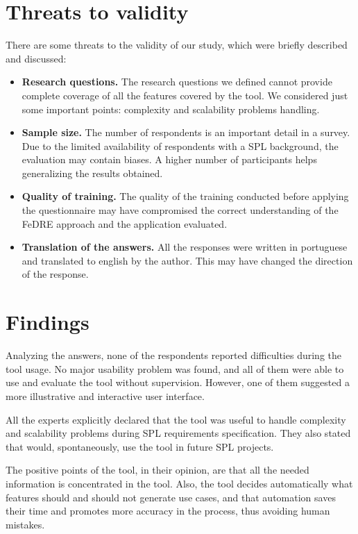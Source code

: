 \section{Threats to validity}
\label{sc:threats}
There are some threats to the validity of our study, which were briefly
described and discussed:
\begin{itemize}
\item \textbf{Research questions.} The research questions we defined cannot
provide complete coverage of all the features covered by the tool. We considered just some important points: complexity and 
scalability problems handling.

\item \textbf{Sample size.} The number of respondents is an important detail in
a survey. Due to the limited availability of respondents with a \ac{SPL} background, the evaluation
may contain biases.
A higher number of participants helps  generalizing the results obtained.

\item \textbf{Quality of training.} The quality of the training conducted before
applying the questionnaire may have compromised the correct understanding of the \ac{FeDRE} approach and 
the application evaluated.

\item \textbf{Translation of the answers.} All the responses were written in
portuguese and translated to english by the author. This may have changed the direction of the response.

\end{itemize}

\section{Findings}
\label{sc:leassonsLearned}
Analyzing the answers, none of the respondents reported difficulties during the tool usage. No major 
usability problem was found, and all of them were able to use and evaluate the tool without supervision. 
However, one of them suggested a more illustrative and interactive user interface.
 
All the experts explicitly declared that the tool was useful to handle complexity and scalability problems 
during \ac{SPL} requirements specification. They also stated that would, spontaneously, use the tool in future \ac{SPL} 
projects.

The positive points of the tool, in their opinion, are that all the needed information is concentrated in the 
tool. Also, the tool decides automatically what features should and should not generate use cases, and that 
automation saves their time and promotes more accuracy in the process, thus avoiding human mistakes. 

